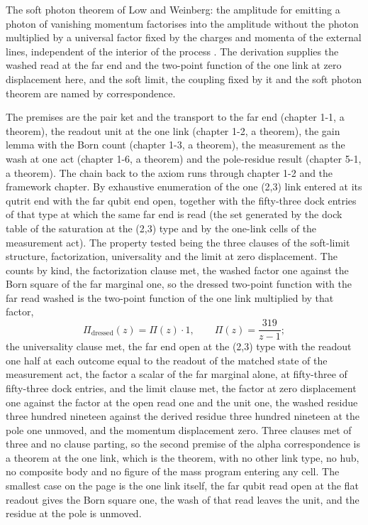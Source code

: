 \begin{chbridge}
The soft photon theorem of Low and Weinberg: the amplitude for emitting a photon of vanishing momentum factorises into the amplitude without the photon multiplied by a universal factor fixed by the charges and momenta of the external lines, independent of the interior of the process \cite{Low1958,Weinberg1965}. The derivation supplies the washed read at the far end and the two-point function of the one link at zero displacement here, and the soft limit, the coupling fixed by it and the soft photon theorem are named by correspondence.
\end{chbridge}
\begin{chproof}[census]
The premises are the pair ket and the transport to the far end (chapter 1-1, a theorem), the readout unit at the one link (chapter 1-2, a theorem), the gain lemma with the Born count (chapter 1-3, a theorem), the measurement as the wash at one act (chapter 1-6, a theorem) and the pole-residue result (chapter 5-1, a theorem). The chain back to the axiom runs through chapter 1-2 and the framework chapter. By exhaustive enumeration of the one (2,3) link entered at its qutrit end with the far qubit end open, together with the fifty-three dock entries of that type at which the same far end is read (the set generated by the dock table of the saturation at the (2,3) type and by the one-link cells of the measurement act). The property tested being the three clauses of the soft-limit structure, factorization, universality and the limit at zero displacement. The counts by kind, the factorization clause met, the washed factor one against the Born square of the far marginal one, so the dressed two-point function with the far read washed is the two-point function of the one link multiplied by that factor,
\begin{equation}
\Pi_{\text{dressed}}(z) = \Pi(z)\cdot 1,\qquad \Pi(z) = \frac{319}{z-1} ;
\end{equation}
the universality clause met, the far end open at the (2,3) type with the readout one half at each outcome equal to the readout of the matched state of the measurement act, the factor a scalar of the far marginal alone, at fifty-three of fifty-three dock entries, and the limit clause met, the factor at zero displacement one against the factor at the open read one and the unit one, the washed residue three hundred nineteen against the derived residue three hundred nineteen at the pole one unmoved, and the momentum displacement zero. Three clauses met of three and no clause parting, so the second premise of the alpha correspondence is a theorem at the one link, which is the theorem, with no other link type, no hub, no composite body and no figure of the mass program entering any cell. The smallest case on the page is the one link itself, the far qubit read open at the flat readout gives the Born square one, the wash of that read leaves the unit, and the residue at the pole is unmoved.


\end{chproof}
